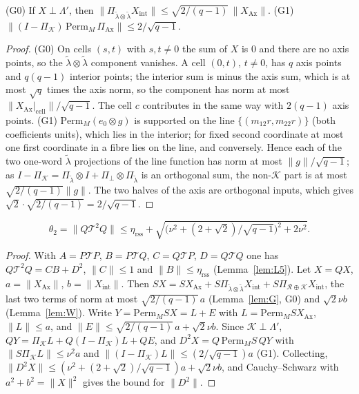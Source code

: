 \begin{lemma}[G0, G1]\label{lem:G}
(G0) If $X\perp\Lambda'$, then $\|\Pi_{\tilde\lambda\otimes\tilde\lambda}X_{\mathrm{int}}\|\le\sqrt{2/(q-1)}\,\|X_{\mathrm{Ax}}\|$.
(G1) $\|(I-\Pi_{\mathcal K})\,\mathrm{Perm}_M\,\Pi_{\mathrm{Ax}}\|\le2/\sqrt{q-1}$.
\end{lemma}
\begin{proof}
(G0) On cells $(s,t)$ with $s,t\ne0$ the sum of $X$ is $0$ and there are no axis points, so the $\tilde\lambda\otimes\tilde\lambda$ component vanishes. A cell
$(0,t)$, $t\ne0$, has $q$ axis points and $q(q-1)$ interior points; the interior sum is minus the axis sum, which is at most $\sqrt q$ times the axis norm,
so the component has norm at most $\|X_{\mathrm{Ax}}|_{\mathrm{cell}}\|/\sqrt{q-1}$. The cell $c$ contributes in the same way with $2(q-1)$ axis points.
(G1) $\mathrm{Perm}_M(e_0\otimes g)$ is supported on the line $\{(m_{12}r,m_{22}r)\}$ (both coefficients units), which lies in the interior; for fixed second
coordinate at most one first coordinate in a fibre lies on the line, and conversely. Hence each of the two one-word $\tilde\lambda$ projections of the
line function has norm at most $\|g\|/\sqrt{q-1}$; as $I-\Pi_{\mathcal K}=\Pi_{\tilde\lambda}\otimes I+\Pi_\perp\otimes\Pi_{\tilde\lambda}$ is an orthogonal sum, the
non-$\mathcal K$ part is at most $\sqrt{2/(q-1)}\|g\|$. The two halves of the axis are orthogonal inputs, which gives $\sqrt2\cdot\sqrt{2/(q-1)}=2/\sqrt{q-1}$.
\end{proof}

\begin{proposition}[D2]\label{prop:appD2}
\[
\theta_2=\|Q\mathcal T^2Q\|\le\eta_{\mathrm{rss}}+\sqrt{\bigl(\nu^2+(2+\sqrt2)/\sqrt{q-1}\bigr)^2+2\nu^2}.
\]
\end{proposition}
\begin{proof}
With $A=P\mathcal TP$, $B=P\mathcal TQ$, $C=Q\mathcal TP$, $D=Q\mathcal TQ$ one has $Q\mathcal T^2Q=CB+D^2$, $\|C\|\le1$ and $\|B\|\le\eta_{\mathrm{rss}}$ (Lemma~\ref{lem:L5}).
Let $X=QX$, $a=\|X_{\mathrm{Ax}}\|$, $b=\|X_{\mathrm{int}}\|$. Then $SX=SX_{\mathrm{Ax}}+S\Pi_{\tilde\lambda\otimes\tilde\lambda}X_{\mathrm{int}}+S\Pi_{\mathcal R\oplus\mathcal K}X_{\mathrm{int}}$, the last two
terms of norm at most $\sqrt{2/(q-1)}\,a$ (Lemma~\ref{lem:G}, G0) and $\sqrt2\nu b$ (Lemma~\ref{lem:W}). Write $Y=\mathrm{Perm}_MSX=L+E$ with
$L=\mathrm{Perm}_MSX_{\mathrm{Ax}}$, $\|L\|\le a$, and $\|E\|\le\sqrt{2/(q-1)}\,a+\sqrt2\nu b$. Since $\mathcal K\perp\Lambda'$, $QY=\Pi_{\mathcal K}L+Q(I-\Pi_{\mathcal K})L+QE$, and
$D^2X=Q\,\mathrm{Perm}_MS\,QY$ with $\|S\Pi_{\mathcal K}L\|\le\nu^2a$ and $\|(I-\Pi_{\mathcal K})L\|\le(2/\sqrt{q-1})a$ (G1). Collecting,
$\|D^2X\|\le(\nu^2+(2+\sqrt2)/\sqrt{q-1})a+\sqrt2\nu b$, and Cauchy--Schwarz with $a^2+b^2=\|X\|^2$ gives the bound for $\|D^2\|$.
\end{proof}

